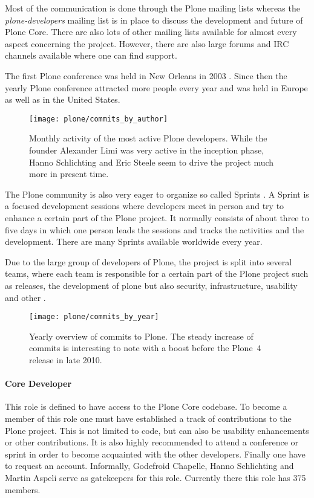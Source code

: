 Most of the communication is done through the Plone mailing lists whereas the
\emph{plone-developers} mailing list is in place to discuss the development and
future of Plone Core. There are also lots of other mailing lists available for
almost every aspect concerning the project. However, there are also large
forums and \ac{IRC} channels available where one can find support.

The first Plone conference was held in New Orleans in 2003
\cite{PloneConferences}. Since then the yearly Plone conference attracted more
people every year and was held in Europe as well as in the United States.

\begin{figure}[htbp]
  \centering
  \texttt{[image: plone/commits\_by\_author]}
  \caption{Monthly activity of the most active Plone developers. While the
  founder Alexander Limi was very active in the inception phase, Hanno
  Schlichting and Eric Steele seem to drive the project much more in present
  time.}
\end{figure}

The Plone community is also very eager to organize so called Sprints
\cite{PloneSprints}. A Sprint is a focused development sessions where
developers meet in person and try to enhance a certain part of the Plone
project. It normally consists of about three to five days in which one person
leads the sessions and tracks the activities and the development. There are
many Sprints available worldwide every year.

Due to the large group of developers of Plone, the project is split into
several teams, where each team is responsible for a certain part of the Plone
project such as releases, the development of plone but also security,
infrastructure, usability and other
\cite{PloneFounders,PloneReleaseManagers,PloneFrameworkTeam,PloneContribute}.

\begin{figure}[htbp]
  \centering
  \texttt{[image: plone/commits\_by\_year]}
  \caption{Yearly overview of commits to Plone. The steady increase of commits
  is interesting to note with a boost before the Plone~4 release in late 2010.}
\end{figure}

\paragraph{Core Developer}

This role is defined to have access to the Plone Core codebase. To become a
member of this role one must have established a track of contributions to the
Plone project. This is not limited to code, but can also be usability
enhancements or other contributions. It is also highly recommended to attend a
conference or sprint in order to become acquainted with the other developers.
Finally one have to request an account. Informally, Godefroid Chapelle, Hanno
Schlichting and Martin Aspeli serve as gatekeepers for this role. Currently
there this role has 375 members.

